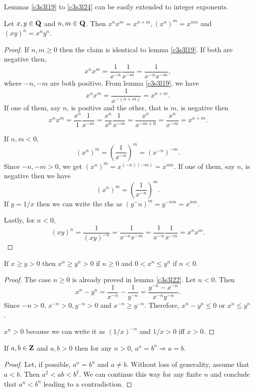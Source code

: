 Lemmas \ref{c3s3l19} to \ref{c3s3l24} can be easily extended to integer
exponents.
\begin{lem}\label{c3s3l25}
Let $x, y \in \mathbf{Q}$ and $n, m \in \mathbf{Q}$. Then $x^n x^m = x^{n + m}, 
(x^n)^m = x^{nm}$ and $(xy)^n = x^n y^n$.
\end{lem}
\begin{proof}
If $n, m \ge 0$ then the claim is identical to lemma \ref{c3s3l19}. If 
both are negative then,
\[
x^n x^m = \frac{1}{x^{-n}}\frac{1}{x^{-m}} = \frac{1}{x^{-n}x^{-m}},
\]
where $-n, -m$ are both positive. From lemma \ref{c3s3l19}, we have
\[
x^n x^m = \frac{1}{x^{-(n+m)}} = x^{n+m}.
\]
If one of them, say $n$, is positive and the other, that is $m$, is
negative then 
\[
x^n x^m = \frac{x^n}{1}\frac{1}{x^{-m}} = \frac{x^n}{x^0}\frac{1}{x^{-m}}
= \frac{x^n}{x^{-m + 0}} = \frac{x^n}{x^{-m}} = x^{n+m}.
\]

If $n, m < 0$,
\[
(x^n)^m = \left(\frac{1}{x^{-n}}\right)^m = (x^{-n})^{-m}.
\]
Since $-n, -m > 0$, we get $(x^n)^m = x^{(-n)(-m)} = x^{nm}$. If one of 
them, say $n$, is negative then we have
\[
(x^n)^m = \left(\frac{1}{x^{-n}}\right)^m.
\]
If $y = 1/x$ then we can write the rhs as $(y^-n)^m = y^{-nm} = x^{nm}$.

Lastly, for $n < 0$, 
\[
(xy)^n = \frac{1}{(xy)^{-n}} = \frac{1}{x^{-n}x^{-m}} = \frac{1}{x^{-n}}
\frac{1}{x^{-m}} = x^nx^m.
\]
\end{proof}

\begin{lem}\label{c3s3l26}
If $x \ge y > 0$ then $x^n \ge y^n > 0$ if $n \ge 0$ and $0 < x^n \le 
y^n$ if $n < 0$.
\end{lem}
\begin{proof}
The case $n \ge 0$ is already proved in lemma \ref{c3s3l22}. Let $n < 0$.
Then 
\[
x^n - y^n = \frac{1}{x^{-n}} - \frac{1}{y^{-n}} = 
\frac{y^{-n} - x^{-n}}{x^{-n}y^{-n}}.
\]
Since $-n > 0$, $x^{-n} > 0, y^{-n} > 0$ and $x^{-n} \ge y^{-n}$. 
Therefore, $x^n - y^n \le 0$ or $x^n \le y^n$.

$x^n > 0$ because we can write it as $(1/x)^{-n}$ and $1/x > 0$ iff $x > 
0$.
\end{proof}

\begin{lem}\label{c3s3l27}
If $a, b \in \mathbf{Z}$ and $a, b > 0$ then for any $n > 0$, $a^n = b^n 
\Rightarrow a = b$.
\end{lem}
\begin{proof}
Let, if possible, $a^n = b^n$ and $a \ne b$. Without loss of generality,
assume that $a < b$. Then $a^2 < ab < b^2$. We can continue this way for
any finite $n$ and conclude that $a^n < b^n$ leading to a contradiction.
\end{proof}

